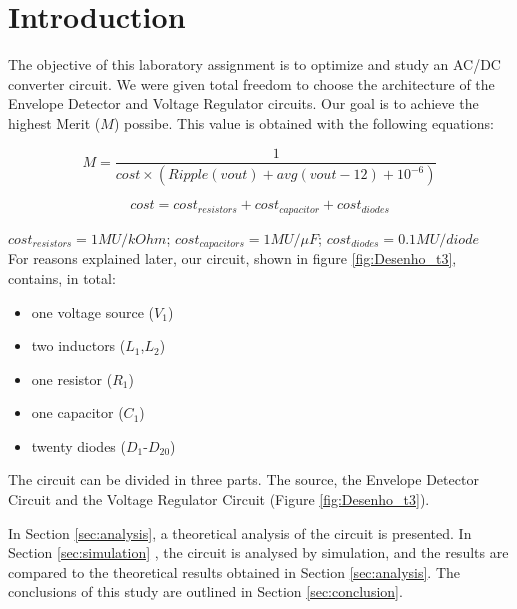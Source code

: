 
\section{Introduction}
\label{sec:introduction}



The objective of this laboratory assignment is to optimize and study an AC/DC converter
circuit. We were given total freedom to choose the architecture of the Envelope Detector
and Voltage Regulator circuits. Our goal is to achieve the highest Merit ($M$) possibe. This
value is obtained with the following equations:
	
\[
M = \frac{1}{cost\times (Ripple(vout) + avg(vout-12) + 10^{-6})}
\]

\[
 cost = cost_{resistors} + cost_{capacitor} + cost_{diodes} 
\]

$cost_{resistors} = 1MU/kOhm$; $cost_{capacitors} = 1MU/\mu F$;
$cost_{diodes} = 0.1MU/diode$ \\

For reasons explained later, our circuit, shown in figure \ref{fig:Desenho_t3}, contains,
in total:

\begin{itemize}
	\item one voltage source ($V_1$)
	\item two inductors ($L_1$,$L_2$)
	\item one resistor ($R_1$)
	\item one capacitor ($C_1$)
	\item twenty diodes ($D_1$-$D_{20}$)
\end{itemize}

The circuit can be divided in three parts. The source, the Envelope Detector Circuit and the
Voltage Regulator Circuit (Figure \ref{fig:Desenho_t3}).

In Section \ref{sec:analysis}, a theoretical analysis of the circuit is presented. In
Section \ref{sec:simulation} , the circuit is analysed by simulation, and the results are
compared to the theoretical results obtained in Section \ref{sec:analysis}. The conclusions
of this study are outlined in Section \ref{sec:conclusion}.




